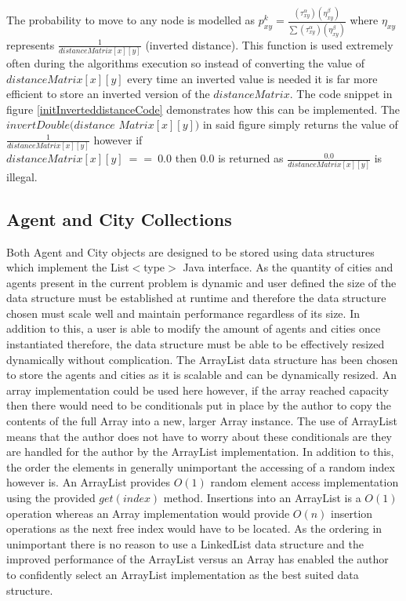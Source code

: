 The probability to move to any node is modelled as $p_{xy}^{k} = \frac{(\tau_{xy}^{\alpha })(\eta _{xy}^{\beta })}{\sum (\tau_{xy}^{\alpha })(\eta _{xy}^{\beta })}$ where $\eta _{xy}$ represents $\frac{1}{distanceMatrix[x][y]}$ (inverted distance). This function is used extremely often during the algorithms execution so instead of converting the value of $distanceMatrix[x][y]$ every time an inverted value is needed it is far more efficient to store an inverted version of the $distanceMatrix$. The code snippet in figure \ref{initInverteddistanceCode} demonstrates how this can be implemented. The $invertDouble(distance$ $Matrix[x][y])$ in said figure simply returns the value of $\frac{1}{distanceMatrix[x][y]}$ however if \\ $distanceMatrix[x][y]\ ==\ 0.0$ then $0.0$ is returned as $\frac{0.0}{distanceMatrix[x][y]}$ is illegal.
  
\subsection{Agent and City Collections}

Both Agent and City objects are designed to be stored using data structures which implement the List$<$type$>$ Java interface. As the quantity of cities and agents present in the current problem is dynamic and user defined the size of the data structure must be established at runtime and therefore the data structure chosen must scale well and maintain performance regardless of its size. In addition to this, a user is able to modify the amount of agents and cities once instantiated therefore, the data structure must be able to be effectively resized dynamically without complication. The ArrayList data structure has been chosen to store the agents and cities as it is scalable and can be dynamically resized. An array implementation could be used here however, if the array reached capacity then there would need to be conditionals put in place by the author to copy the contents of the full Array into a new, larger Array instance. The use of ArrayList means that the author does not have to worry about these conditionals are they are handled for the author by the ArrayList implementation. In addition to this, the order the elements in generally unimportant the accessing of a random index however is. An ArrayList provides $O(1)$ random element access implementation using the provided $get(index)$ method. Insertions into an ArrayList is a $O(1)$ operation whereas an Array implementation would provide $O(n)$ insertion operations as the next free index would have to be located. As the ordering in unimportant there is no reason to use a LinkedList data structure and the improved performance of the ArrayList versus an Array has enabled the author to confidently select an ArrayList implementation as the best suited data structure. 

